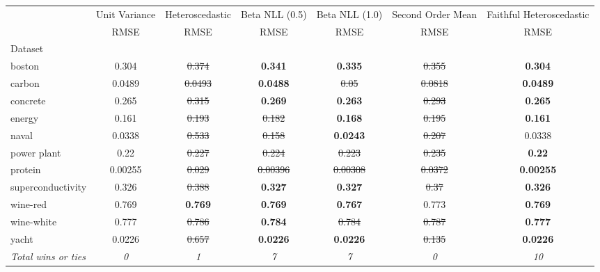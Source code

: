 \begin{tabular}{l|c|c|c|c|c|c}
\toprule
{} & {Unit Variance} & {Heteroscedastic} & {Beta NLL (0.5)} & {Beta NLL (1.0)} & {Second Order Mean} & {Faithful Heteroscedastic} \\
{} & {RMSE} & {RMSE} & {RMSE} & {RMSE} & {RMSE} & {RMSE} \\
{Dataset} & {} & {} & {} & {} & {} & {} \\
\midrule
boston & 0.304 & \sout{0.374} & \textbf{0.341} & \textbf{0.335} & \sout{0.355} & \textbf{0.304} \\
carbon & 0.0489 & \sout{0.0493} & \textbf{0.0488} & \sout{0.05} & \sout{0.0818} & \textbf{0.0489} \\
concrete & 0.265 & \sout{0.315} & \textbf{0.269} & \textbf{0.263} & \sout{0.293} & \textbf{0.265} \\
energy & 0.161 & \sout{0.193} & \sout{0.182} & \textbf{0.168} & \sout{0.195} & \textbf{0.161} \\
naval & 0.0338 & \sout{0.533} & \sout{0.158} & \textbf{0.0243} & \sout{0.207} & 0.0338 \\
power plant & 0.22 & \sout{0.227} & \sout{0.224} & \sout{0.223} & \sout{0.235} & \textbf{0.22} \\
protein & 0.00255 & \sout{0.029} & \sout{0.00396} & \sout{0.00308} & \sout{0.0372} & \textbf{0.00255} \\
superconductivity & 0.326 & \sout{0.388} & \textbf{0.327} & \textbf{0.327} & \sout{0.37} & \textbf{0.326} \\
wine-red & 0.769 & \textbf{0.769} & \textbf{0.769} & \textbf{0.767} & 0.773 & \textbf{0.769} \\
wine-white & 0.777 & \sout{0.786} & \textbf{0.784} & \sout{0.784} & \sout{0.787} & \textbf{0.777} \\
yacht & 0.0226 & \sout{0.657} & \textbf{0.0226} & \textbf{0.0226} & \sout{0.135} & \textbf{0.0226} \\
\textit{{Total wins or ties}} & \textit{0} & \textit{1} & \textit{7} & \textit{7} & \textit{0} & \textit{10} \\
\bottomrule
\end{tabular}
